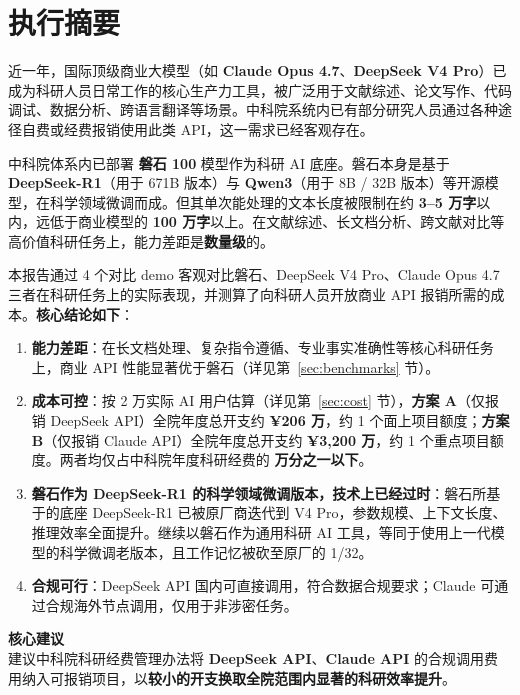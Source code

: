\section{执行摘要}
\label{sec:summary}

近一年，国际顶级商业大模型（如 \textbf{Claude Opus 4.7}、\textbf{DeepSeek V4 Pro}）已成为科研人员日常工作的核心生产力工具，被广泛用于文献综述、论文写作、代码调试、数据分析、跨语言翻译等场景。中科院系统内已有部分研究人员通过各种途径自费或经费报销使用此类 API，这一需求已经客观存在。

中科院体系内已部署 \textbf{磐石 100} 模型作为科研 AI 底座。磐石本身是基于 \textbf{DeepSeek-R1}（用于 671B 版本）与 \textbf{Qwen3}（用于 8B / 32B 版本）等开源模型，在科学领域微调而成。但其单次能处理的文本长度被限制在约 \textbf{3--5 万字}以内，远低于商业模型的 \textbf{100 万字}以上。在文献综述、长文档分析、跨文献对比等高价值科研任务上，能力差距是\textbf{数量级}的。

本报告通过 4 个对比 demo 客观对比磐石、DeepSeek V4 Pro、Claude Opus 4.7 三者在科研任务上的实际表现，并测算了向科研人员开放商业 API 报销所需的成本。\textbf{核心结论如下}：

\vspace{4pt}
\begin{enumerate}[label=\textbf{\arabic*.}, leftmargin=22pt]
\item \textbf{能力差距}：在长文档处理、复杂指令遵循、专业事实准确性等核心科研任务上，商业 API 性能显著优于磐石（详见第~\ref{sec:benchmarks} 节）。

\item \textbf{成本可控}：按 2 万实际 AI 用户估算（详见第~\ref{sec:cost} 节），\textbf{方案 A}（仅报销 DeepSeek API）全院年度总开支约 \textbf{¥206 万}，约 1 个面上项目额度；\textbf{方案 B}（仅报销 Claude API）全院年度总开支约 \textbf{¥3,200 万}，约 1 个重点项目额度。两者均仅占中科院年度科研经费的 \textbf{万分之一以下}。

\item \textbf{磐石作为 DeepSeek-R1 的科学领域微调版本，技术上已经过时}：磐石所基于的底座 DeepSeek-R1 已被原厂商迭代到 V4 Pro，参数规模、上下文长度、推理效率全面提升。继续以磐石作为通用科研 AI 工具，等同于使用上一代模型的科学微调老版本，且工作记忆被砍至原厂的 1/32。

\item \textbf{合规可行}：DeepSeek API 国内可直接调用，符合数据合规要求；Claude 可通过合规海外节点调用，仅用于非涉密任务。
\end{enumerate}

\vspace{8pt}
\begin{keypoint}
\sffamily\textbf{核心建议}\\[4pt]
\normalfont
建议中科院科研经费管理办法将 \textbf{DeepSeek API}、\textbf{Claude API} 的合规调用费用纳入可报销项目，以\textbf{较小的开支换取全院范围内显著的科研效率提升}。
\end{keypoint}
